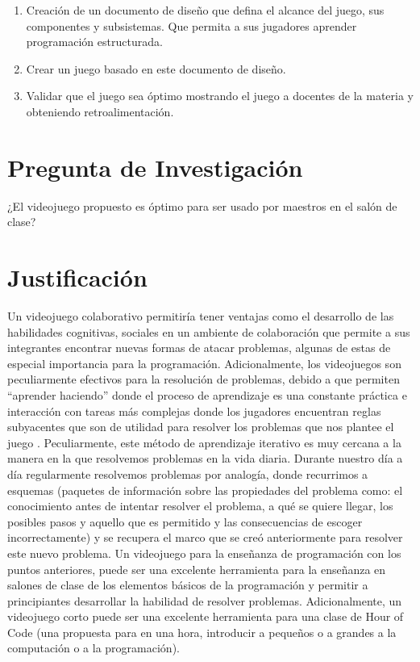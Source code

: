 \begin{enumerate}
    \item Creación de un documento de diseño que defina el alcance del juego, sus componentes y subsistemas. Que permita a sus jugadores aprender programación estructurada.
    \item Crear un juego basado en este documento de diseño.
    \item Validar que el juego sea óptimo mostrando el juego a docentes de la materia y obteniendo retroalimentación.
\end{enumerate}

\section{Pregunta de Investigación}
¿El videojuego propuesto es óptimo para ser usado por maestros en el salón de clase?

\section{Justificación}
Un videojuego colaborativo permitiría tener ventajas como el desarrollo de las habilidades cognitivas, sociales en un ambiente de colaboración que permite a sus integrantes encontrar nuevas formas de atacar problemas, algunas de estas de especial importancia para la programación. 
Adicionalmente, los videojuegos son peculiarmente efectivos para la resolución de problemas, debido a que permiten “aprender haciendo” donde el proceso de aprendizaje es una constante práctica e interacción con tareas más complejas donde los jugadores encuentran reglas subyacentes que son de utilidad para resolver los problemas que nos plantee el juego \cite{monjelat-a}. Peculiarmente, este método de aprendizaje iterativo es muy cercana a la manera en la que resolvemos problemas en la vida diaria. Durante nuestro día a día regularmente resolvemos problemas por analogía, donde recurrimos a esquemas (paquetes de información sobre las propiedades del problema como: el conocimiento antes de intentar resolver el problema, a qué se quiere llegar, los posibles pasos y aquello que es permitido y las consecuencias de escoger incorrectamente) y se recupera el marco que se creó anteriormente para resolver este nuevo problema.
Un videojuego para la enseñanza de programación con los puntos anteriores, puede ser una excelente herramienta para la enseñanza en salones de clase de los elementos básicos de la programación y permitir a principiantes desarrollar la habilidad de resolver problemas. Adicionalmente, un videojuego corto puede ser una excelente herramienta para una clase de Hour of Code (una propuesta para en una hora, introducir a pequeños o a grandes a la computación o a la programación).


